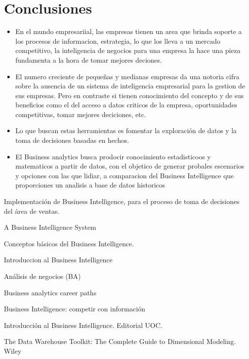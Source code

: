 \documentclass[twoside,twocolumn]{article}
\begin{document}
\section{Conclusiones}
\begin{itemize}	

	\item  En el mundo empresariial, las empresas tienen un area que brinda soporte a los procesos de informacion, estrategia, lo que los lleva a un mercado competitivo, la inteligencia de negocios para una empresa la hace una pieza fundamenta a la hora de tomar mejores deciones.
	\item El numero creciente de pequeñas y medianas empresas da una notoria cifra sobre la ausencia de un sistema de inteligencia empresarial para la gestion de sus empresas. Pero en contraste si tienen conocimiento del concepto y de sus beneficios como el del acceso a datos criticos de la empresa, oportunidades competitivas, tomar mejores deciciones, etc.
	\item Lo que buscan estas herramientas es fomentar la exploración de datos y la toma de decisiones basadas en hechos.
	\item El Business analytics busca prodocir conocimiento estadisticoos y matematicos a partir de datos, con el objetico de generar probales escenarios y opciones con las que lidiar, a comparacion del Business Intelligence que proporciones un analisis a base de datos historicos

\end{itemize} 





\begin{thebibliography}{99} 

\newblock Implementación de Business Intelligence, para el proceso de toma de decisiones del área de ventas.

\newblock A Business Intelligence System

Conceptos básicos del Business Intelligence.

\newblock Introduccion al Business Intelligence

\newblock Análisis de negocios (BA)

\newblock Business analytics career paths

\newblock Business Intelligence: competir con información


\bibitem[Curto J., 2010]{} 
\newblock Introducción al Business Intelligence. Editorial UOC.

\newblock  The Data Warehouse Toolkit: The Complete Guide to Dimensional Modeling. Wiley
 
\end{thebibliography}


\end{document}
